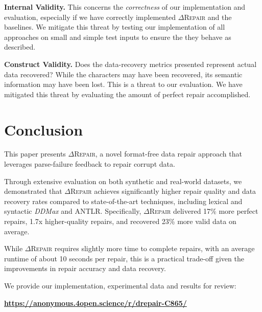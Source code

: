 \documentclass[acmsmall,screen,review,anonymous]{acmart}
\newcommand{\formatfree}{format-free\xspace}
\newcommand{\dtask}{data repair\xspace}
\newcommand{\approach}{\textsc{$\Delta$Repair}\xspace}
\newcommand{\ddmax}{\textit{DDMax}\xspace}
\newcommand{\drepair}{\approach}
\begin{document}
\noindent\textbf{Internal Validity.} This concerns the \textit{correctness} of our implementation and evaluation, especially if we have correctly implemented \approach and the baselines. We mitigate this threat by testing our implementation of all approaches on small and simple test inputs to ensure the they behave as described. 

\noindent\textbf{Construct Validity.} 
Does the data-recovery metrics presented
represent actual data recovered? While the characters may have been recovered,
its semantic information may have been lost. This is a threat to our evaluation.
We have mitigated this threat by evaluating the amount of perfect repair accomplished.


\section{Conclusion}
\label{sec:conclusion}

This paper presents \drepair, a novel \formatfree \dtask approach that
leverages parse-failure feedback to repair corrupt data.

Through extensive evaluation on both synthetic and real-world
datasets, we demonstrated that \drepair achieves significantly higher repair
quality and data recovery rates compared to state-of-the-art techniques,
including lexical and syntactic \ddmax and ANTLR. Specifically, \drepair
delivered 17\% more perfect repairs,
1.7x higher-quality repairs,
and recovered 23\% more valid data on average.

While \drepair requires slightly more time to complete repairs, with an average
runtime of about 10 seconds per repair, this is a practical trade-off given the
improvements in repair accuracy and data recovery.

We provide our implementation, experimental data and results for review:

\begin{center}
   \textbf{\url{https://anonymous.4open.science/r/drepair-C865/}} %
\end{center}




\end{document}
